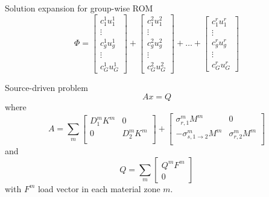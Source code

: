\documentclass[12pt]{article}
\begin{document}
Solution expansion for group-wise ROM
\[
\Phi = 
\begin{bmatrix}
c^1_1 u^1_1 \\
\vdots \\
c^1_g u^1_g \\
\vdots \\
c^1_G u^1_G 
\end{bmatrix}
+ 
\begin{bmatrix}
c^2_1 u^2_1 \\
\vdots \\
c^2_g u^2_g \\
\vdots \\
c^2_G u^2_G 
\end{bmatrix}
+ 
\ldots
+
\begin{bmatrix}
c^r_1 u^r_1 \\
\vdots \\
c^r_g u^r_g \\
\vdots \\
c^r_G u^r_G 
\end{bmatrix}
\]


Source-driven problem
\[
A x = Q
\]
where
\[
A = \sum_m 
\begin{bmatrix}
D_1^m K^m & 0\\
0 & D_2^m K^m \\
\end{bmatrix}
+
\begin{bmatrix}
\sigma_{r,1}^m M^m & 0\\
-\sigma_{s,1\to2}^m M^m & \sigma_{r,2}^m M^m \\
\end{bmatrix}
\]
and
\[
Q = \sum_m 
\begin{bmatrix}
Q^m F^m \\
0 
\end{bmatrix}
\]
with $F^m$ load vector in each material zone $m$.
\end{document}
